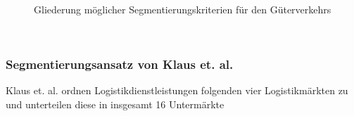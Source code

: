 \begin{figure}[htbp]
  \centering
  \caption{ Gliederung möglicher Segmentierungskriterien für den Güterverkehrs}
  \label{_Ref347430764}
\end{figure}
~\\


% 
\subsubsection{Segmentierungsansatz von Klaus et. al.}
\label{_Toc366766092}
\label{_Toc366775286}
Klaus et. al. ordnen Logistikdienstleistungen folgenden vier Logistikmärkten zu und unterteilen diese in insgesamt 16 Untermärkte  \autocites[][]{bib.371} ~\\

